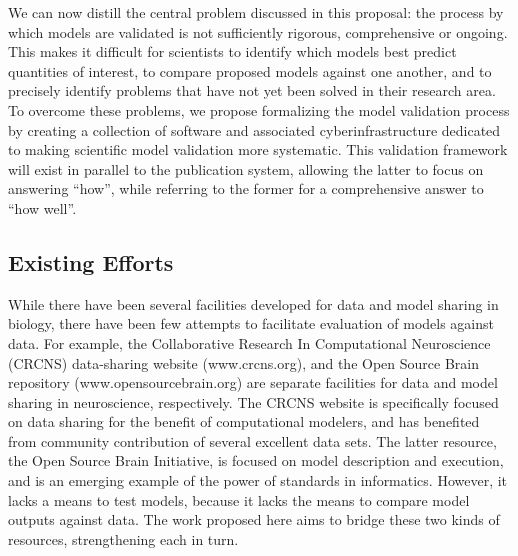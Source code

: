 \documentclass[11pt,letterpaper]{article}
\begin{document}
We can now distill the central problem discussed in this proposal: the process by which models are validated is not sufficiently rigorous, comprehensive or ongoing. This makes it difficult for scientists to identify which models best predict quantities of interest, to compare proposed models against one another, and to precisely identify problems that have not yet been solved in their research area. To overcome these problems, we propose formalizing the model validation process by creating a collection of software and associated cyberinfrastructure dedicated to making scientific model validation more systematic.  This validation framework will exist in parallel to the publication system, allowing the latter to focus on answering ``how'', while referring to the former for a comprehensive answer to ``how well''. 

\subsection{Existing Efforts}
While there have been several facilities developed for data and model sharing in biology, there have been few attempts to facilitate evaluation of models against data.  For example, the Collaborative Research In Computational Neuroscience (CRCNS) data-sharing website (www.crcns.org), and the Open Source Brain repository (www.opensourcebrain.org) are separate facilities for data and model sharing in neuroscience, respectively.  The CRCNS website is specifically focused on data sharing for the benefit of computational modelers, and has benefited from community contribution of several excellent data sets. The latter resource, the Open Source Brain Initiative, is focused on model description and execution, and is an emerging example of the power of standards in informatics.  However, it lacks a means to test models, because it lacks the means to compare model outputs against data. The work proposed here aims to bridge these two kinds of resources, strengthening each in turn.
\end{document}
